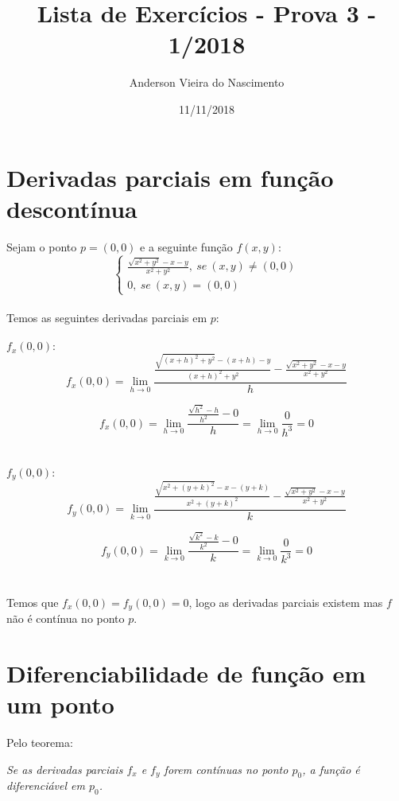 \documentclass[11pt]{article}
\begin{document}
\title{Lista de Exercícios - Prova 3 - 1/2018}
\author{Anderson Vieira do Nascimento}
\date{11/11/2018}
\maketitle

\section{Derivadas parciais em função descontínua}

Sejam o ponto $p = (0, 0)$ e a seguinte função $f(x, y)$:\\

\[ \begin{cases}
		\frac{\sqrt{x^2 + y^2} - x - y}{x^2 + y^2}, \ se \ (x, y) \neq (0, 0)\\
		0, \ se \ (x, y) = (0, 0)
	\end{cases}
\]\\

Temos as seguintes derivadas parciais em $p$:\\
\\
$f_x(0, 0):$
$$f_x(0, 0) = \lim_{h \rightarrow 0} \frac{\frac{\sqrt{(x+h)^2 + y^2} - (x + h) - y}{(x+h)^2 + y^2} - \frac{\sqrt{x^2 + y^2} - x - y}{x^2 + y^2}}{h}$$

$$f_x(0, 0) = \lim_{h \rightarrow 0} \frac{\frac{\sqrt{h^2} - h}{h^2} - 0}{h} = \lim_{h \rightarrow 0} \frac{0}{h^3} = 0$$\\
\\
$f_y(0, 0):$
$$f_y(0, 0) = \lim_{k \rightarrow 0} \frac{\frac{\sqrt{x^2 + (y+k)^2} - x - (y+k)}{x^2 + (y+k)^2} - \frac{\sqrt{x^2 + y^2} - x - y}{x^2 + y^2}}{k}$$

$$f_y(0, 0) = \lim_{k \rightarrow 0} \frac{\frac{\sqrt{k^2} - k}{k^2} - 0}{k} = \lim_{k \rightarrow 0} \frac{0}{k^3} = 0$$\\
\\
Temos que $f_x(0, 0) = f_y(0, 0) = 0$, logo as derivadas parciais existem mas $f$ não é contínua no ponto $p$.

\section{Diferenciabilidade de função em um ponto}

Pelo teorema:

\textit{Se as derivadas parciais $f_x$ e $f_y$ forem contínuas no ponto $p_0$, a função é diferenciável em $p_0$.}\\
\end{document}
